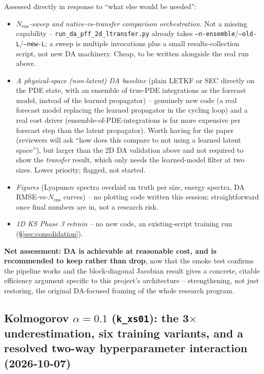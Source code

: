 \documentclass[11pt]{article}
\begin{document}
Assessed directly in response to ``what else would be needed'':
\begin{itemize}[leftmargin=*]
\item \emph{$N_{\mathrm{ens}}$-sweep and native-vs-transfer comparison
  orchestration.} Not a missing capability -- \texttt{run\_da\_pff\_2d\_ltransfer.py}
  already takes \texttt{--n-ensemble}/\texttt{--old-L}/\texttt{--new-L}; a sweep is
  multiple invocations plus a small results-collection script, not new
  DA machinery. Cheap, to be written alongside the real run above.
\item \emph{A physical-space (non-latent) DA baseline} (plain LETKF or
  SEC directly on the PDE state, with an ensemble of true-PDE
  integrations as the forecast model, instead of the learned
  propagator) -- genuinely new code (a real forecast model replacing the
  learned propagator in the cycling loop) and a real cost driver
  (ensemble-of-PDE-integrations is far more expensive per forecast step
  than the latent propagator). Worth having for the paper (reviewers
  will ask ``how does this compare to not using a learned latent
  space''), but larger than the 2D DA validation above and not required
  to show the \emph{transfer} result, which only needs the learned-model
  filter at two sizes. Lower priority; flagged, not started.
\item \emph{Figures} (Lyapunov spectra overlaid on truth per size, energy
  spectra, DA RMSE-vs-$N_{\mathrm{ens}}$ curves) -- no plotting code
  written this session; straightforward once final numbers are in,
  not a research risk.
\item \emph{1D KS Phase 3 retrain} -- no new code, an existing-script
  training run (\S\ref{sec:consolidation}).
\end{itemize}
\textbf{Net assessment: DA is achievable at reasonable cost, and is
recommended to keep rather than drop}, now that the smoke test confirms
the pipeline works and the block-diagonal Jacobian result gives a
concrete, citable efficiency argument specific to this project's
architecture -- strengthening, not just restoring, the original
DA-focused framing of the whole research program.

\subsection{Kolmogorov $\alpha{=}0.1$ (\texttt{k\_xs01}): the 3$\times$
underestimation, six training variants, and a resolved two-way
hyperparameter interaction (2026-10-07)}
\label{sec:k_xs01_ablation}
\end{document}
